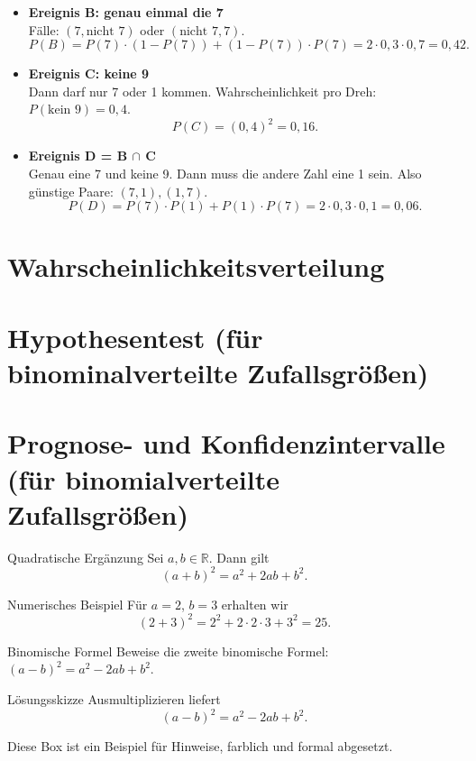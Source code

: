 \documentclass[11pt,a4paper,oneside]{article}
\begin{document}
\begin{loesung}{}
\begin{itemize}
			\item \textbf{Ereignis B: genau einmal die 7}\\
			Fälle: \((7,\text{nicht 7})\) oder \((\text{nicht 7},7)\).  
			\[
			P(B)=P(7)\cdot(1-P(7))+ (1-P(7))\cdot P(7)=2\cdot 0{,}3\cdot 0{,}7=0{,}42.
			\]
			
			\item \textbf{Ereignis C: keine 9}\\
			Dann darf nur 7 oder 1 kommen. Wahrscheinlichkeit pro Dreh: \(P(\text{kein 9})=0{,}4\).  
			\[
			P(C)=(0{,}4)^2=0{,}16.
			\]
			
			\item \textbf{Ereignis D = B $\cap$ C}\\
			Genau eine 7 und keine 9.  
			Dann muss die andere Zahl eine 1 sein. Also günstige Paare: \((7,1),(1,7)\).  
			\[
			P(D)=P(7)\cdot P(1)+P(1)\cdot P(7)=2\cdot 0{,}3\cdot 0{,}1=0{,}06.
			\]
		\end{itemize}
	\end{loesung}
	
	\newpage
	
	
	\section{Wahrscheinlichkeitsverteilung}
	
	\section{Hypothesentest (für binominalverteilte Zufallsgrößen)}
	
	\section{Prognose- und Konfidenzintervalle (für binomialverteilte Zufallsgrößen)}
	
	\newpage
	
	
	\begin{theo}{Quadratische Ergänzung}
		Sei \(a,b\in \mathbb{R}\). Dann gilt
		\[
		(a+b)^2 = a^2 + 2ab + b^2.
		\]
	\end{theo}
	
	\begin{exem}{Numerisches Beispiel}
		Für \(a=2\), \(b=3\) erhalten wir
		\[
		(2+3)^2 = 2^2 + 2\cdot 2\cdot 3 + 3^2 = 25.
		\]
	\end{exem}
	
	\begin{aufgabe}{Binomische Formel}
		Beweise die zweite binomische Formel: \((a-b)^2 = a^2 - 2ab + b^2\).
	\end{aufgabe}
	
	\begin{loesung}{Lösungsskizze}
		Ausmultiplizieren liefert
		\[
		(a-b)^2 = a^2 - 2ab + b^2.
		\]
	\end{loesung}
	
	\begin{infobox}
		Diese Box ist ein Beispiel für Hinweise, farblich und formal abgesetzt.
	\end{infobox}
	
\end{document}
